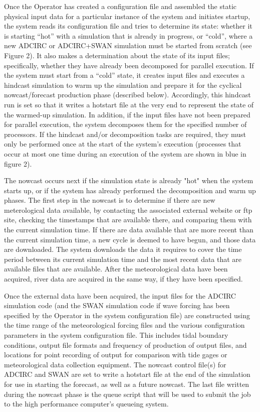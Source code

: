 \documentclass[12pt]{article}
\begin{document}
Once the Operator has created a configuration file and assembled the 
static physical input data for a particular instance of the system 
and initiates startup, the system reads its configuration file and 
tries to determine its state: whether it is starting “hot” with a 
simulation that is already in progress, or “cold”, where a new 
ADCIRC or ADCIRC+SWAN simulation must be started from scratch (see 
Figure 2). It also makes a determination about the state of its 
input files; specifically, whether they have already been decomposed 
for parallel execution. If the system must start from a “cold” 
state, it creates input files and executes a hindcast simulation to 
warm up the simulation and prepare it for the cyclical 
nowcast/forecast production phase (described below). Accordingly, 
this hindcast run is set so that it writes a hotstart file at the 
very end to represent the state of the warmed-up simulation. In 
addition, if the input files have not been prepared for parallel 
execution, the system decomposes them for the specified number of 
processors. If the hindcast and/or decomposition tasks are required, 
they must only be performed once at the start of the system's 
execution (processes that occur at most one time during an execution 
of the system are shown in blue in figure 2).

The nowcast occurs next if the simulation state is already "hot" 
when the system starts up, or if the system has already performed 
the decomposition and warm up phases. The first step in the nowcast 
is to determine if there are new meterological data available, by 
contacting the associated external website or ftp site, checking the 
timestamps that are available there, and comparing them with the 
current simulation time. If there are data available that are more 
recent than the current simulation time, a new cycle is deemed to 
have begun, and those data are downloaded. The system downloads the 
data it requires to cover the time period between its current 
simulation time and the most recent data that are available files 
that are available. After the meteorological data have been 
acquired, river data are acquired in the same way, if they have been 
specified. 

Once the external data have been acquired, the input files for the 
ADCIRC simulation code (and the SWAN simulation code if wave forcing 
has been specified by the Operator in the system configuration file) 
are constructed using the time range of the meteorological forcing 
files and the various configuration parameters in the system 
configuration file. This includes tidal boundary conditions, output 
file formats and frequency of production of output files, and 
locations for point recording of output for comparison with tide 
gages or meteorological data collection equipment. The nowcast 
control file(s) for ADCIRC and SWAN are set to write a hotstart file 
at the end of the simulation for use in starting the forecast, as 
well as a future nowcast. The last file written during the nowcast 
phase is the queue script that will be used to submit the job to the 
high performance computer's queueing system.
\end{document}
